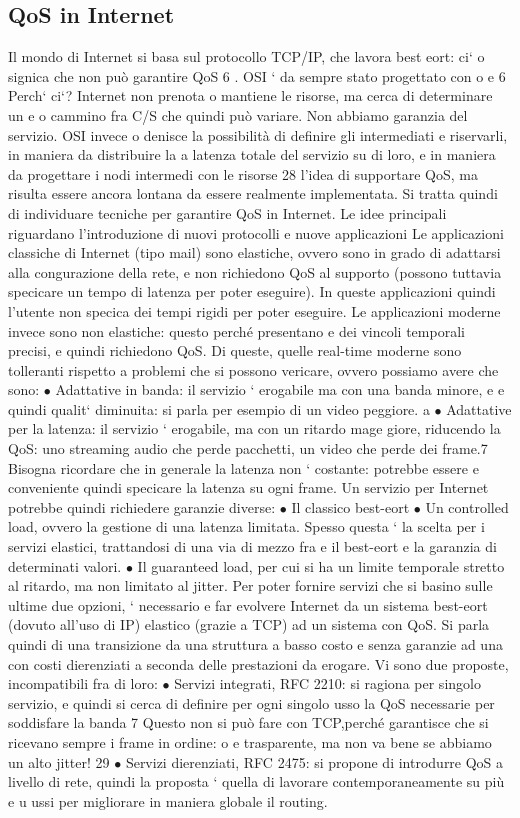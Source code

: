 \documentclass[a4paper,12pt]{article}
\begin{document}
\subsection{QoS in Internet}
Il mondo di Internet si basa sul protocollo TCP/IP, che lavora best eort: ci`
o
signica che non può garantire QoS 6 . OSI ` da sempre stato progettato con
o
e
6 Perch` ci`? Internet non prenota o mantiene le risorse, ma cerca di determinare un
e o
cammino fra C/S che quindi può variare. Non abbiamo garanzia del servizio. OSI invece
o
denisce la possibilità di definire gli intermediati e riservarli, in maniera da distribuire la
a
latenza totale del servizio su di loro, e in maniera da progettare i nodi intermedi con le risorse
28
l'idea di supportare QoS, ma risulta essere ancora lontana da essere realmente
implementata. Si tratta quindi di individuare tecniche per garantire QoS in Internet. Le idee principali riguardano
l'introduzione di nuovi protocolli e nuove
applicazioni
Le applicazioni classiche di Internet (tipo mail) sono elastiche, ovvero sono
in grado di adattarsi alla congurazione della rete, e non richiedono QoS al
supporto (possono tuttavia specicare un tempo di latenza per poter eseguire).
In queste applicazioni quindi l'utente non specica dei tempi rigidi per poter
eseguire.
Le applicazioni moderne invece sono non elastiche: questo perché presentano
e
dei vincoli temporali precisi, e quindi richiedono QoS. Di queste, quelle real-time
moderne sono tolleranti rispetto a problemi che si possono vericare, ovvero
possiamo avere che sono:
$\bullet$ Adattative in banda: il servizio ` erogabile ma con una banda minore, e
e
quindi qualit` diminuita: si parla per esempio di un video peggiore.
a
$\bullet$ Adattative per la latenza: il servizio ` erogabile, ma con un ritardo mage
giore, riducendo la QoS: uno streaming audio che perde pacchetti, un video
che perde dei frame.7
Bisogna ricordare che in generale la latenza non ` costante: potrebbe essere
e
conveniente quindi specicare la latenza su ogni frame.
Un servizio per Internet potrebbe quindi richiedere garanzie diverse:
$\bullet$ Il classico best-eort
$\bullet$ Un controlled load, ovvero la gestione di una latenza limitata. Spesso
questa ` la scelta per i servizi elastici, trattandosi di una via di mezzo fra
e
il best-eort e la garanzia di determinati valori.
$\bullet$ Il guaranteed load, per cui si ha un limite temporale stretto al ritardo, ma
non limitato al jitter.
Per poter fornire servizi che si basino sulle ultime due opzioni, ` necessario
e
far evolvere Internet da un sistema best-eort (dovuto all'uso di IP) elastico
(grazie a TCP) ad un sistema con QoS. Si parla quindi di una transizione da
una struttura a basso costo e senza garanzie ad una con costi dierenziati a
seconda delle prestazioni da erogare. Vi sono due proposte, incompatibili fra di
loro:
$\bullet$ Servizi integrati, RFC 2210: si ragiona per singolo servizio, e quindi si
cerca di definire per ogni singolo usso la QoS
necessarie per soddisfare la banda
7 Questo non si può fare con TCP,perché garantisce che si ricevano sempre i frame in ordine:
o
e
trasparente, ma non va bene se abbiamo un alto jitter!
29
$\bullet$ Servizi dierenziati, RFC 2475: si propone di introdurre QoS a livello di
rete, quindi la proposta ` quella di lavorare contemporaneamente su più
e
u
ussi per migliorare in maniera globale il routing.
\end{document}
